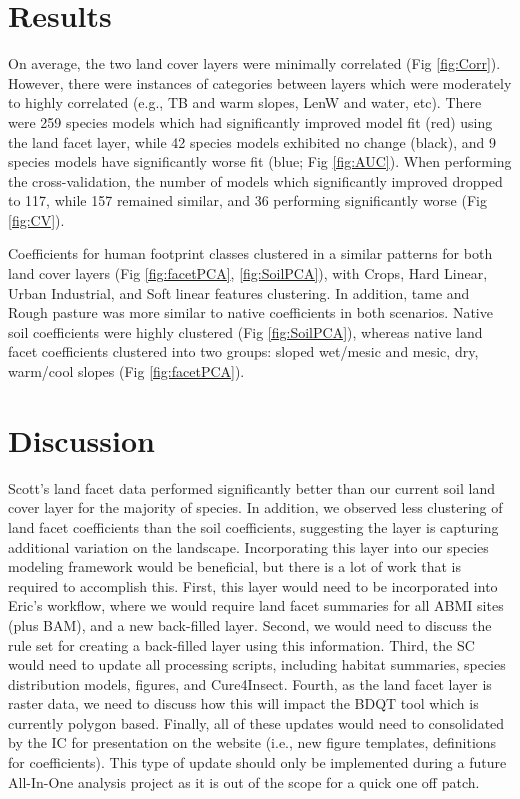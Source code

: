 \documentclass[12pt]{article}
\begin{document}
\section{Results}

On average, the two land cover layers were minimally correlated (Fig \ref{fig:Corr}). However, there were instances of categories between layers which were moderately to highly correlated (e.g., TB and warm slopes, LenW and water, etc). There were 259 species models which had significantly improved model fit (red) using the land facet layer, while 42 species models exhibited no change (black), and 9 species models have significantly worse fit (blue; Fig \ref{fig:AUC}). When performing the cross-validation, the number of models which significantly improved dropped to 117, while 157 remained similar, and 36 performing significantly worse (Fig \ref{fig:CV}).

Coefficients for human footprint classes clustered in a similar patterns for both land cover layers (Fig \ref{fig:facetPCA}, \ref{fig:SoilPCA}), with Crops, Hard Linear, Urban Industrial, and Soft linear features clustering. In addition, tame and Rough pasture was more similar to native coefficients in both scenarios. Native soil coefficients were highly clustered (Fig \ref{fig:SoilPCA}), whereas native land facet coefficients clustered into two groups: sloped wet/mesic and mesic, dry, warm/cool slopes (Fig \ref{fig:facetPCA}).

\section{Discussion}

Scott's land facet data performed significantly better than our current soil land cover layer for the majority of species. In addition, we observed less clustering of land facet coefficients than the soil coefficients, suggesting the layer is capturing additional variation on the landscape. Incorporating this layer into our species modeling framework would be beneficial, but there is a lot of work that is required to accomplish this. First, this layer would need to be incorporated into Eric's workflow, where we would require land facet summaries for all ABMI sites (plus BAM), and a new back-filled layer. Second, we would need to discuss the rule set for creating a back-filled layer using this information. Third, the SC would need to update all processing scripts, including habitat summaries, species distribution models, figures, and Cure4Insect. Fourth, as the land facet layer is raster data, we need to discuss how this will impact the BDQT tool which is currently polygon based. Finally, all of these updates would need to consolidated by the IC for presentation on the website (i.e., new figure templates, definitions for coefficients). This type of update should only be implemented during a future All-In-One analysis project as it is out of the scope for a quick one off patch.
\end{document}
